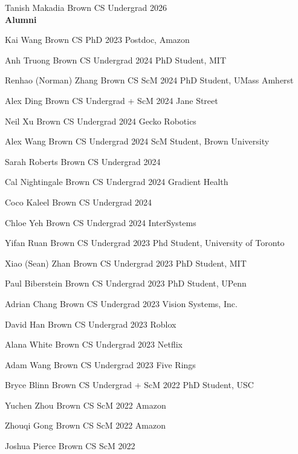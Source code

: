 \documentclass[line,margin]{res}
\begin{document}
\begin{resume}
\student
{Tanish Makadia}
{Brown CS Undergrad}
{2026}
\\


\textbf{Alumni}

\alumni
{Kai Wang}
{Brown CS PhD}
{2023}
{Postdoc, Amazon}

\alumni
{Anh Truong}
{Brown CS Undergrad}
{2024}
{PhD Student, MIT}

\alumni
{Renhao (Norman) Zhang}
{Brown CS ScM}
{2024}
{PhD Student, UMass Amherst}


\alumni
{Alex Ding}
{Brown CS Undergrad + ScM}
{2024}
{Jane Street}

\alumni
{Neil Xu}
{Brown CS Undergrad}
{2024}
{Gecko Robotics}

\alumni
{Alex Wang}
{Brown CS Undergrad}
{2024}
{ScM Student, Brown University}

\alumni
{Sarah Roberts}
{Brown CS Undergrad}
{2024}
{}

\alumni
{Cal Nightingale}
{Brown CS Undergrad}
{2024}
{Gradient Health}

\alumni
{Coco Kaleel}
{Brown CS Undergrad}
{2024}
{}

\alumni
{Chloe Yeh}
{Brown CS Undergrad}
{2024}
{InterSystems}

\alumni
{Yifan Ruan}
{Brown CS Undergrad}
{2023}
{Phd Student, University of Toronto}

\alumni
{Xiao (Sean) Zhan}
{Brown CS Undergrad}
{2023}
{PhD Student, MIT}

\alumni
{Paul Biberstein}
{Brown CS Undergrad}
{2023}
{PhD Student, UPenn}

\alumni
{Adrian Chang}
{Brown CS Undergrad}
{2023}
{Vision Systems, Inc.}

\alumni
{David Han}
{Brown CS Undergrad}
{2023}
{Roblox}

\alumni
{Alana White}
{Brown CS Undergrad}
{2023}
{Netflix}

\alumni
{Adam Wang}
{Brown CS Undergrad}
{2023}
{Five Rings}

\alumni
{Bryce Blinn}
{Brown CS Undergrad + ScM}
{2022}	
{PhD Student, USC}

\alumni
{Yuchen Zhou}
{Brown CS ScM}
{2022}
{Amazon}

\alumni
{Zhouqi Gong}
{Brown CS ScM}
{2022}
{Amazon}

\alumni
{Joshua Pierce}
{Brown CS ScM}
{2022}
{}


\end{resume}
\end{document}
